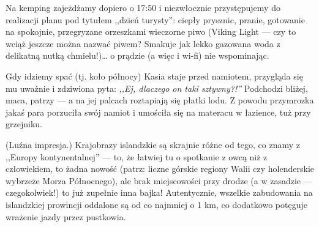 
Na kemping zajeżdżamy dopiero o 17:50 i niezwłocznie przystępujemy do realizacji planu pod tytułem ,,dzień turysty'': ciepły prysznic, pranie, gotowanie na spokojnie, przegryzane orzeszkami wieczorne piwo (Viking Light --- czy to wciąż jeszcze można nazwać piwem? Smakuje jak lekko gazowana woda z delikatną nutką chmielu!)… o prądzie (a więc i wi-fi) nie wspominając.

Gdy idziemy spać (tj. koło północy) Kasia staje przed namiotem, przygląda się mu uważnie i zdziwiona pyta: \emph{,,Ej, dlaczego on taki sztywny?!''} Podchodzi bliżej, maca, patrzy --- a na jej palcach roztapiają się płatki lodu. Z powodu przymrozka jakaś para porzuciła swój namiot i umościła się na materacu  w łazience, tuż przy grzejniku.


(Luźna impresja.) Krajobrazy islandzkie są skrajnie różne od tego, co znamy z ,,Europy kontynentalnej'' --- to, że łatwiej tu o spotkanie z owcą niż z człowiekiem, to żadna nowość (patrz: liczne górskie regiony Walii czy holenderskie wybrzeże Morza Północnego), ale brak miejscowości przy drodze (a w zasadzie --- czegokolwiek!) to już zupełnie inna bajka! Autentycznie, wszelkie zabudowania na islandzkiej prowincji oddalone są od  co najmniej o 1 km, co dodatkowo potęguje wrażenie jazdy przez pustkowia.


